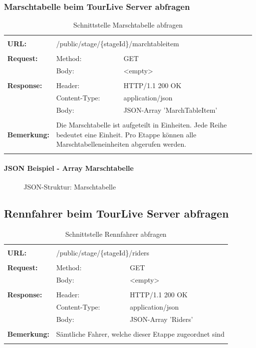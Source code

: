 \subsubsection{Marschtabelle beim TourLive Server abfragen}
\begin{longtable}{ p{2.5cm} || p{3.5cm} p{5.5cm}}
&  \\ [-1.5ex]
	\textbf{URL:} & \multicolumn{2}{l}{/public/stage/\{stageId\}/marchtableitem}  \\ [1ex] \hline & &  \\ [-1.5ex]
	\textbf{Request:} & Method: & GET \\
		& Body: & <empty> \\ [1ex] \hline & &  \\ [-1.5ex]
	\textbf{Response:} &  Header: & HTTP/1.1 200 OK \\
		& Content-Type: & application/json \\
		& Body: & JSON-Array 'MarchTableItem' \\ [1ex] \hline & &  \\ [-1.5ex]
	\textbf{Bemerkung:} & \multicolumn{2}{p{9cm}}{Die Marschtabelle ist aufgeteilt in Einheiten. Jede Reihe bedeutet eine Einheit. Pro Etappe können alle Marschtabelleneinheiten abgerufen werden.} \\ [1ex] 
\caption{Schnittstelle Marschtabelle abfragen}
\end{longtable}

\paragraph{JSON Beispiel - Array Marschtabelle}
\begin{figure}[H]
	\centering
	
	\caption{JSON-Struktur: Marschtabelle}
\end{figure}

\newpage
\subsection{Rennfahrer beim TourLive Server abfragen}
\begin{longtable}{ p{2.5cm} || p{3.5cm} p{5.5cm}}
&  \\ [-1.5ex]	
	\textbf{URL:} & \multicolumn{2}{l}{/public/stage/\{stageId\}/riders}  \\ [1ex] \hline & &  \\ [-1.5ex]
	\textbf{Request:} & Method: & GET \\
		& Body: & <empty> \\ [1ex] \hline & &  \\ [-1.5ex]
	\textbf{Response:} &  Header: & HTTP/1.1 200 OK \\
		& Content-Type: & application/json \\
		& Body: & JSON-Array 'Riders' \\ [1ex] \hline & &  \\ [-1.5ex]
	\textbf{Bemerkung:} & \multicolumn{2}{p{9cm}}{Sämtliche Fahrer, welche dieser Etappe zugeordnet sind} \\ [1ex] 
\caption{Schnittstelle Rennfahrer abfragen}
\end{longtable}

